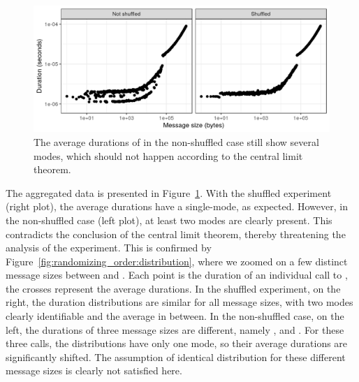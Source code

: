         \begin{figure}[htpb]
            \centering
            \includegraphics[width=\linewidth]{img/experiment/randomizing_order/aggregated_data.png}
            \caption{The average durations of \recv in the non-shuffled case still show several modes,
            which should not happen according to the central limit theorem.}%
            \label{fig:randomizing_order:avg_data}
        \end{figure}

        The aggregated data is presented in Figure~\ref{fig:randomizing_order:avg_data}. With the shuffled experiment
        (right plot), the average durations have a single-mode, as expected. However, in the non-shuffled case (left
        plot), at least two modes are clearly present. This contradicts the conclusion of the central limit theorem,
        thereby threatening the analysis of the experiment. This is confirmed by
        Figure~\ref{fig:randomizing_order:distribution}, where we zoomed on a few distinct message sizes between
         and . Each point is the duration of an individual call to \recv,
        the crosses represent the average durations. In the shuffled experiment, on the right, the duration
        distributions are similar for all message sizes, with two modes clearly identifiable and the average in between.
        In the non-shuffled case, on the left, the durations of three message sizes are different, namely
        ,  and . For these three calls, the distributions have only one
        mode, so their average durations are significantly shifted. The assumption of identical distribution for these
        different message sizes is clearly not satisfied here.

